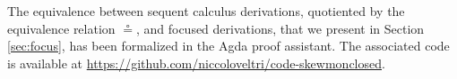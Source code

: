 \documentclass[submission,copyright,creativecommons]{eptcs}
\theoremstyle{definition}
\begin{document}

The equivalence between sequent calculus derivations, quotiented by the equivalence relation $\circeq$, and focused derivations, that we present in Section \ref{sec:focus}, has been formalized in the Agda proof assistant. The associated code is available at \url{https://github.com/niccoloveltri/code-skewmonclosed}.
\end{document}
